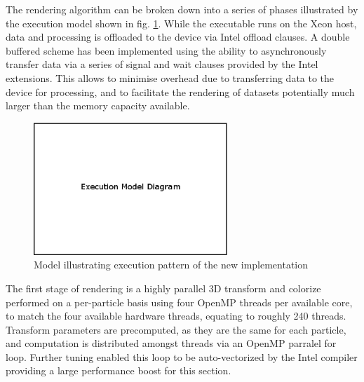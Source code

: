 \documentclass[runningheads,a4paper]{llncs}
\begin{document}
The rendering algorithm can be broken down into a series of phases illustrated by the execution model shown in fig. \ref{fig:exmodel}.
While the executable runs on the Xeon host, data and processing is offloaded to the device via Intel offload clauses.
A double buffered scheme has been implemented using the ability to asynchronously transfer data via a series of signal 
and wait clauses provided by the Intel extensions. This allows to minimise overhead due to transferring data to the device 
for processing, and to facilitate the rendering of datasets potentially much larger than the memory capacity available.

\begin{figure}
\centering
\includegraphics[height=5.0cm]{exmodel}
\caption{Model illustrating execution pattern of the new implementation}
\label{fig:exmodel}
\end{figure}


The first stage of rendering is a highly parallel 3D transform and colorize performed on a per-particle basis using 
four OpenMP threads per available core, to match the four available hardware threads, equating to roughly 240 threads. 
Transform parameters are precomputed, as they are the same for each particle, and computation is distributed amongst 
threads via an OpenMP parralel for loop. Further tuning enabled this loop to be auto-vectorized by the Intel compiler 
providing a large performance boost for this section.
\end{document}
